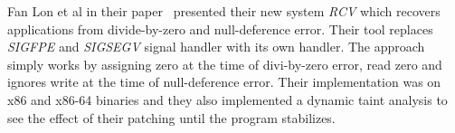 Fan Lon et al in their paper~\cite{DBLP:conf/pldi/LongSR14} presented their new
system \emph{RCV} which recovers applications from divide-by-zero and
null-deference error. Their tool replaces \emph{SIGFPE} and \emph{SIGSEGV}
signal handler with its own handler. The approach simply works by assigning
zero at the time of divi-by-zero error, read zero and ignores write at the time
of null-deference error. Their implementation was on x86 and x86-64 binaries and
they also implemented a dynamic taint analysis to see the effect of their
patching until the program stabilizes.

